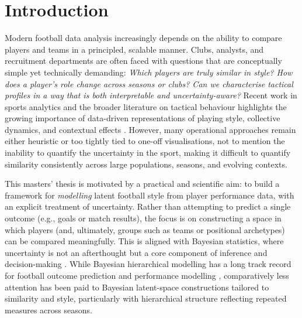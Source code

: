 \documentclass{fmetfm}
\begin{document}
\mainmatter

\chapter{Introduction}

Modern football data analysis increasingly depends on the ability to compare players and teams in a principled, scalable manner. Clubs, analysts, and recruitment departments are often faced with questions that are conceptually simple yet technically demanding: \emph{Which players are truly similar in style? How does a player’s role change across seasons or clubs? Can we characterise tactical profiles in a way that is both interpretable and uncertainty-aware?} Recent work in sports analytics and the broader literature on tactical behaviour highlights the growing importance of data-driven representations of playing style, collective dynamics, and contextual effects \cite{teixeira2025mapping,orucc2024analysis}. However, many operational approaches remain either heuristic or too tightly tied to one-off visualisations, not to mention the inability to quantify the uncertainty in the sport, making it difficult to quantify similarity consistently across large populations, seasons, and evolving contexts.

This masters' thesis is motivated by a practical and scientific aim: to build a framework for \emph{modelling} latent football style from player performance data, with an explicit treatment of uncertainty. Rather than attempting to predict a single outcome (e.g., goals or match results), the focus is on constructing a space in which players (and, ultimately, groups such as teams or positional archetypes) can be compared meaningfully. This is aligned with Bayesian statistics, where uncertainty is not an afterthought but a core component of inference and decision-making \cite{swinton2023bayesian}. While Bayesian hierarchical modelling has a long track record for football outcome prediction \cite{baio2010bayesian} and performance modelling \cite{ribeiro2025bayesian}, comparatively less attention has been paid to Bayesian latent-space constructions tailored to similarity and style, particularly with hierarchical structure reflecting repeated measures across seasons.
\end{document}

